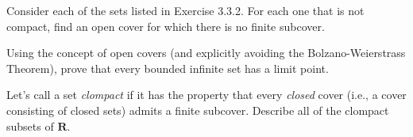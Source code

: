 \begin{solution}
  \enum{
  \item \TODO
  \item \TODO
  \item \TODO
  }
\end{solution}

\begin{exercise}
  Consider each of the sets listed in Exercise 3.3.2. For each one that is not compact, find an open cover for which there is no finite subcover.
\end{exercise}

\begin{solution}
  \TODO
\end{solution}


\begin{exercise}
  Using the concept of open covers (and explicitly avoiding the Bolzano-Weierstrass Theorem), prove that every bounded infinite set has a limit point.
\end{exercise}

\begin{solution}
  \TODO
\end{solution}

\begin{exercise}
  Let's call a set \emph{clompact} if it has the property that every \emph{closed} cover (i.e., a cover consisting of closed sets) admits a finite subcover. Describe all of the clompact subsets of $\mathbf{R}$.
\end{exercise}

\begin{solution}
  \TODO
\end{solution}

